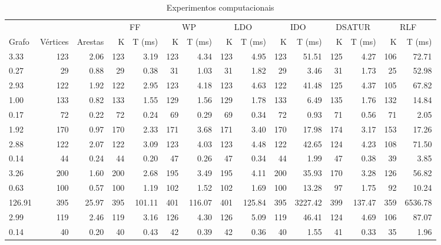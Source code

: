 \begin{table*}
    \caption{Experimentos computacionais}
    \begin{adjustbox}{width=\textwidth}%
    \small
    \centering
    \begin{minipage}[b]{\textwidth}
        \centering
\begin{tabular}{@{} lrrrrrrrrrrrrrr @{}}
\toprule
& & & \multicolumn{2}{c}{FF} & \multicolumn{2}{c}{WP} & \multicolumn{2}{c}{LDO} & \multicolumn{2}{c}{IDO} & \multicolumn{2}{c}{DSATUR} & \multicolumn{2}{c}{RLF}\\
\cmidrule(lr){4-5}\cmidrule(lr){6-7}\cmidrule(lr){8-9}\cmidrule(lr){10-11}\cmidrule(lr){12-13}\cmidrule(lr){14-15}
Grafo & Vértices & Arestas & K & T (ms) & K & T (ms) & K & T (ms) & K & T (ms) & K & T (ms) & K & T (ms) \\
\midrule
3.33 & 123 & 2.06 & 123 & 3.19 & 123 & 4.34 & 123 & 4.95 & 123 & 51.51 & 125 & 4.27 & 106 & 72.71 \\
0.27 & 29 & 0.88 & 29 & 0.38 & 31 & 1.03 & 31 & 1.82 & 29 & 3.46 & 31 & 1.73 & 25 & 52.98 \\
2.93 & 122 & 1.92 & 122 & 2.95 & 123 & 4.18 & 123 & 4.63 & 122 & 41.48 & 125 & 4.37 & 105 & 67.82 \\
1.00 & 133 & 0.82 & 133 & 1.55 & 129 & 1.56 & 129 & 1.78 & 133 & 6.49 & 135 & 1.76 & 132 & 14.84 \\
0.17 & 72 & 0.22 & 72 & 0.24 & 69 & 0.29 & 69 & 0.34 & 72 & 0.93 & 71 & 0.56 & 71 & 2.05 \\
1.92 & 170 & 0.97 & 170 & 2.33 & 171 & 3.68 & 171 & 3.40 & 170 & 17.98 & 174 & 3.17 & 153 & 17.26 \\
2.88 & 122 & 2.07 & 122 & 3.09 & 123 & 4.03 & 123 & 4.48 & 122 & 42.65 & 124 & 4.23 & 108 & 71.50 \\
0.14 & 44 & 0.24 & 44 & 0.20 & 47 & 0.26 & 47 & 0.34 & 44 & 1.99 & 47 & 0.38 & 39 & 3.85 \\
3.26 & 200 & 1.60 & 200 & 2.68 & 195 & 3.49 & 195 & 4.11 & 200 & 35.93 & 170 & 3.28 & 126 & 56.82 \\
0.63 & 100 & 0.57 & 100 & 1.19 & 102 & 1.52 & 102 & 1.69 & 100 & 13.28 & 97 & 1.75 & 92 & 10.24 \\
126.91 & 395 & 25.97 & 395 & 101.11 & 401 & 116.07 & 401 & 125.84 & 395 & 3227.42 & 399 & 137.47 & 359 & 6536.78 \\
2.99 & 119 & 2.46 & 119 & 3.16 & 126 & 4.30 & 126 & 5.09 & 119 & 46.41 & 124 & 4.69 & 106 & 87.07 \\
0.14 & 40 & 0.20 & 40 & 0.43 & 42 & 0.39 & 42 & 0.36 & 40 & 1.55 & 41 & 0.33 & 35 & 1.96 \\

\end{tabular}
\end{minipage}
\end{adjustbox}
\end{table*}
